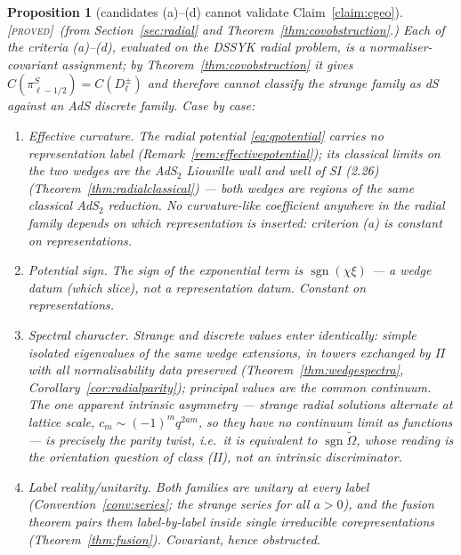 \documentclass[11pt,a4paper]{article}
\newcommand{\PROVED}{{\color{ForestGreen}\textsc{[proved]}}}
\theoremstyle{definition}
\theoremstyle{plain}
\newtheorem{proposition}[definition]{Proposition}
\newcommand{\tCas}{\tilde\Omega}                %
\begin{document}
\begin{proposition}[candidates (a)--(d) cannot validate Claim~\ref{claim:cgeo}]
\label{prop:criterioncases}
\PROVED\ (from Section~\ref{sec:radial} and Theorem~\ref{thm:covobstruction}.) Each of the
criteria (a)--(d), evaluated on the DSSYK radial problem, is a normaliser-covariant
assignment; by Theorem~\ref{thm:covobstruction} it gives
$C(\pi^{S}_{\ell-1/2})=C(D^{\pm}_{\ell})$ and therefore cannot classify the strange family as
dS against an AdS discrete family. Case by case:
\begin{enumerate}[label=(\alph*)]
\item \emph{Effective curvature.} The radial potential \eqref{eq:qpotential} carries no
representation label (Remark~\ref{rem:effectivepotential}); its classical limits on the two
wedges are the AdS$_2$ Liouville wall and well of SI (2.26)
(Theorem~\ref{thm:radialclassical}) --- both wedges are regions of the \emph{same} classical
AdS$_{2}$ reduction. No curvature-like coefficient anywhere in the radial family depends on
which representation is inserted: criterion (a) is constant on representations.
\item \emph{Potential sign.} The sign of the exponential term is
$\operatorname{sgn}(\chi\xi)$ --- a wedge datum (which slice), not a representation datum.
Constant on representations.
\item \emph{Spectral character.} Strange and discrete values enter identically: simple
isolated eigenvalues of the same wedge extensions, in towers exchanged by $\Pi$ with all
normalisability data preserved (Theorem~\ref{thm:wedgespectra},
Corollary~\ref{cor:radialparity}); principal values are the common continuum. The one
apparent intrinsic asymmetry --- strange radial solutions alternate at lattice scale,
$c_{m}\sim(-1)^{m}q^{2am}$, so they have no continuum limit as functions --- is precisely
the parity twist, i.e.\ it is \emph{equivalent to} $\operatorname{sgn}\tCas$, whose reading
is the orientation question of class (II), not an intrinsic discriminator.
\item \emph{Label reality/unitarity.} Both families are unitary at every label
(Convention~\ref{conv:series}; the strange series for \emph{all} $a>0$), and the fusion
theorem pairs them label-by-label inside single irreducible corepresentations
(Theorem~\ref{thm:fusion}). Covariant, hence obstructed.
\end{enumerate}
\end{proposition}
\end{document}

